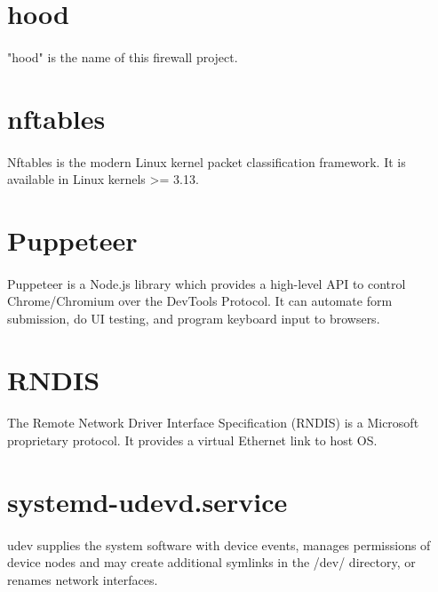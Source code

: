 \documentclass[mscthesis]{usiinfthesis}
\begin{document}
\section{hood}\label{sec:hood}
\paragraph{}
"hood" is the name of this firewall project.

\section{nftables}\label{sec:nftables}
\paragraph{}
Nftables is the modern Linux kernel packet classification framework. It is available in Linux kernels >= 3.13.

\section{Puppeteer}\label{sec:Puppeteer}
\paragraph{}
Puppeteer is a Node.js library which provides a high-level API to control Chrome/Chromium over the DevTools Protocol. It can automate form submission, do UI testing, and program keyboard input to browsers.

\section{RNDIS}\label{sec:RNDIS}
\paragraph{}
The Remote Network Driver Interface Specification (RNDIS) is a Microsoft proprietary protocol. It provides a virtual Ethernet link to host OS.

\section{systemd-udevd.service}\label{sec:systemd-udevd.service}
\paragraph{}
udev supplies the system software with device events, manages permissions of device nodes and may create additional symlinks in the /dev/ directory, or renames network interfaces.
\end{document}
